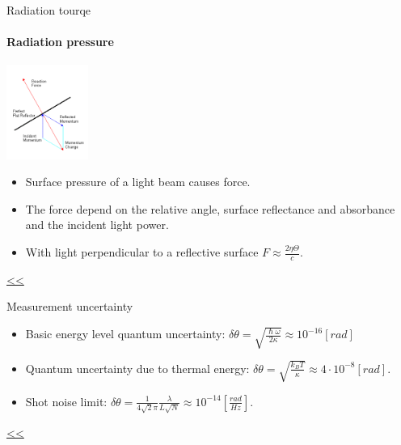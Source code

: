\documentclass{beamer}
\begin{document}
\begin{frame}{\hypertarget{frame:Radiation tourqe 1}{Radiation tourqe}}
\framesubtitle{Radiation pressure}
	\begin{center}		
		\includegraphics[width=0.2\textwidth,keepaspectratio]{radiation.PNG}
    \end{center}

	
	\begin{itemize}		
		\item Surface pressure of a light beam causes force.
		\item The force depend on the relative angle, surface reflectance and absorbance and the incident light power.
		\item With light perpendicular to a reflective surface $F  \approx\frac{2\eta\Theta}{{c}} $.
		
	\end{itemize}
	\hyperlink{frame:Radiation tourqe}{<<} 
\end{frame}

\begin{frame}{\hypertarget{frame:Measurement uncertainty 1}{Measurement uncertainty}}
	\begin{itemize}
		\framesubtitle{Fundamental limits}
		\item Basic energy level quantum uncertainty: $\delta\theta= \sqrt{\frac{\hslash\omega}{2\kappa}} \approx 10^{-16} [rad]$
		\item Quantum uncertainty due to thermal energy: $\delta\theta = \sqrt{\frac{k_B T}{\kappa}} \approx 4\cdot 10^{-8} [rad]$.
		\item Shot noise limit: $\delta\theta = \frac{1}{4\sqrt{2}\pi}\frac{\lambda}{L\sqrt{N}} \approx 10^{-14} [\frac{rad}{Hz}]$.
		
	\end{itemize}
	\hyperlink{frame:Measurement uncertainty}{<<}
\end{frame}
\end{document}
